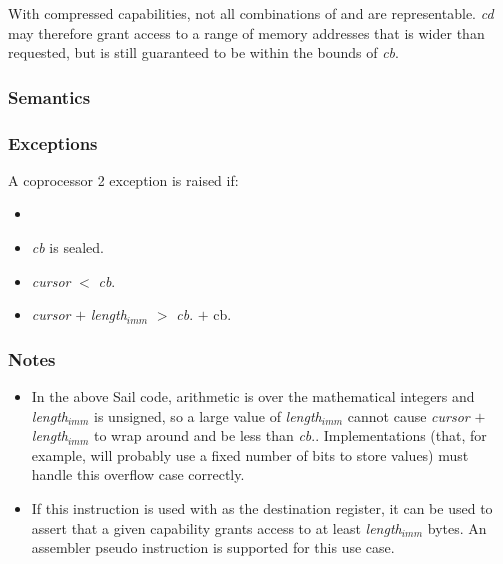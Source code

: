 
With compressed capabilities, not all combinations of \cbase{} and \clength{}
are representable.
\emph{cd} may therefore grant access to a range of memory addresses that is
wider than requested, but is still guaranteed to be within the bounds of
\emph{cb}.

\subsubsection*{Semantics}

\subsubsection*{Exceptions}

A coprocessor 2 exception is raised if:

\begin{itemize}
\item
\cchecktag{}
\item
\emph{cb} is sealed.
\item
\emph{cursor} $<$ \emph{cb}.\cbase{}
\item
\emph{cursor} $+$ \emph{length$_{imm}$} $>$ \emph{cb}.\cbase{} $+$ cb.\clength{}
\end{itemize}

\subsubsection*{Notes}

\begin{itemize}
\item
In the above Sail code, arithmetic is over the mathematical integers and
\emph{length$_{imm}$} is unsigned, so a large value of \emph{length$_{imm}$} cannot cause
\emph{cursor} $+$ \emph{length$_{imm}$} to wrap around and be less than \emph{cb}.\cbase{}.
Implementations (that, for example, will probably use a fixed number of
bits to store values) must handle this overflow case correctly.
\item If this instruction is used with  as the destination register, it can be used to assert that a given capability grants access to at least \emph{length$_{imm}$} bytes. An assembler pseudo instruction  is supported for this use case.
\end{itemize}
